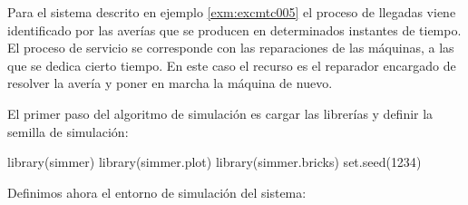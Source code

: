 \documentclass[
]{book}
\newenvironment{Shaded}{\begin{snugshade}}{\end{snugshade}}
\newcommand{\DecValTok}[1]{\textcolor[rgb]{0.00,0.00,0.81}{#1}}
\newcommand{\FunctionTok}[1]{\textcolor[rgb]{0.00,0.00,0.00}{#1}}
\newcommand{\NormalTok}[1]{#1}
\theoremstyle{definition}
\theoremstyle{definition}
\theoremstyle{definition}
\theoremstyle{definition}
\theoremstyle{remark}
\begin{document}
Para el sistema descrito en ejemplo \ref{exm:excmtc005} el proceso de llegadas viene identificado por las averías que se producen en determinados instantes de tiempo. El proceso de servicio se corresponde con las reparaciones de las máquinas, a las que se dedica cierto tiempo. En este caso el recurso es el reparador encargado de resolver la avería y poner en marcha la máquina de nuevo.

El primer paso del algoritmo de simulación es cargar las librerías y definir la semilla de simulación:

\begin{Shaded}
\begin{Highlighting}[]
\FunctionTok{library}\NormalTok{(simmer)}
\FunctionTok{library}\NormalTok{(simmer.plot)}
\FunctionTok{library}\NormalTok{(simmer.bricks)}
\FunctionTok{set.seed}\NormalTok{(}\DecValTok{1234}\NormalTok{)}
\end{Highlighting}
\end{Shaded}

Definimos ahora el entorno de simulación del sistema:
\end{document}
